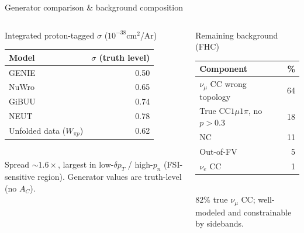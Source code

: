 \documentclass[aspectratio=169,10pt]{beamer}
\begin{document}
\begin{frame}{Generator comparison \& background composition}
  \begin{columns}[T]
  \begin{block}{Integrated proton-tagged $\sigma$ ($10^{-38}$cm$^2$/Ar)}\scriptsize
  \begin{tabular}{lr}
  \toprule Model & $\sigma$ (truth level)\\\midrule
  GENIE & 0.50\\
  NuWro & 0.65\\
  GiBUU & 0.74\\
  NEUT  & 0.78\\\midrule
  Unfolded data ($W_{\pi p}$) & 0.62\\
  \bottomrule
  \end{tabular}\\[1.5mm]
  {\scriptsize Spread $\sim\!1.6\times$, largest in low-$\delta p_T$ / high-$p_n$ (FSI-sensitive region). Generator values are truth-level (no $A_C$).}
  \end{block}
  \begin{block}{Remaining background (FHC)}\footnotesize
  \begin{tabular}{lr}
  \toprule Component & \%\\\midrule
  $\nu_\mu$ CC wrong topology & 64\\
  True CC$1\mu1\pi$, no $p{>}0.3$ & 18\\
  NC & 11\\
  Out-of-FV & 5\\
  $\nu_e$ CC & 1\\
  \bottomrule
  \end{tabular}\\[1mm]
  {\scriptsize $82\%$ true $\nu_\mu$ CC; well-modeled and constrainable by sidebands.}
  \end{block}
  \end{columns}
\end{frame}
\end{document}

